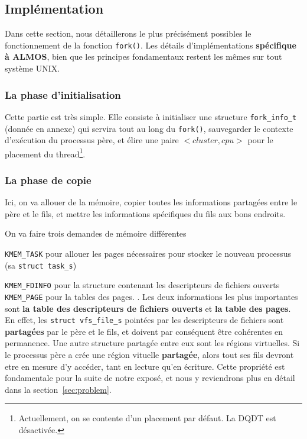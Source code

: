   \subsection{Implémentation}

    Dans cette section, nous détaillerons le plus précisément possibles le
    fonctionnement de la fonction \texttt{fork()}. Les détails d'implémentations
    \textbf{spécifique à ALMOS}, bien que les principes fondamentaux restent les
    mêmes sur tout système UNIX.

    \subsubsection{La phase d'initialisation}

      Cette partie est très simple. Elle consiste à initialiser une structure
      \texttt{fork\_info\_t} (donnée en annexe) qui servira tout au long du
      \texttt{fork()}, sauvegarder le contexte d'exécution du processus père, et
      élire une paire $<cluster, cpu>$ pour le placement du
      thread\footnote{Actuellement, on se contente d'un placement par défaut. La
      DQDT\cite{almos-phd} est désactivée.}.
    

    \subsubsection{La phase de copie}

      Ici, on va allouer de la mémoire, copier toutes les informations partagées
      entre le père et le fils, et mettre les informations spécifiques du fils
      aux bons endroits.

      On va faire trois demandes de mémoire différentes \benumline \item
      \texttt{KMEM\_TASK} pour allouer les pages nécessaires pour stocker le
      nouveau processus (sa \texttt{struct task\_s}) \item \texttt{KMEM\_FDINFO}
      pour la structure contenant les descripteurs de fichiers ouverts
      \texttt{KMEM\_PAGE} pour la tables des pages.  \eenumline. Les deux informations les plus
      importantes sont \textbf{la table des descripteurs de fichiers ouverts} et
      \textbf{la table des pages}. En effet, les \texttt{struct vfs\_file\_s}
      pointées par les descripteurs de fichiers sont \textbf{partagées} par le
      père et le fils, et doivent par conséquent être cohérentes en permanence.
      Une autre structure partagée entre eux sont les régions virtuelles. Si le
      processus père a crée une région vituelle \textbf{partagée}, alors tout
      ses fils devront etre en mesure d'y accéder, tant en lecture qu'en
      écriture. Cette propriété est fondamentale pour la suite de notre exposé,
      et nous y reviendrons plus en détail dans la section~\ref{sec:problem}.

